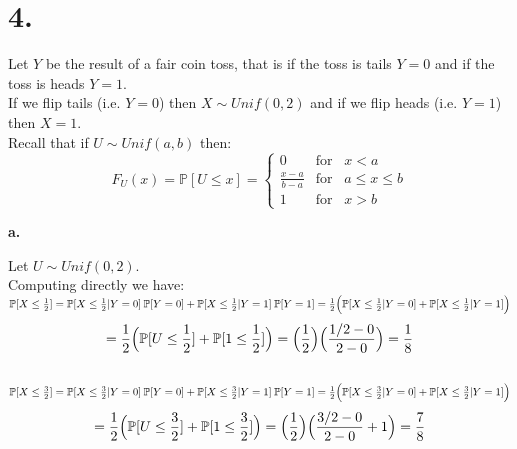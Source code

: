 \documentclass{article}
\begin{document}
\newpage
\section*{4.}
\begin{center}
\doublespacing
    Let $Y$ be the result of a fair coin toss, that is if the toss is tails $Y = 0$ and if the toss is heads $Y = 1$.
    \\If we flip tails (i.e. $Y = 0$) then $X\sim Unif(0, 2)$ and if we flip heads (i.e. $Y = 1$) then $X = 1$.
    \\Recall that if $U\sim Unif(a, b)$ then:
    \[F_U (x) = \mathbb{P}[U\leq x] =
    \begin{cases}
        0 & \mbox{for}\;\;\;x < a \\
        \frac{x - a}{b - a} & \mbox{for}\;\;\;a\leq x\leq b \\
        1 & \mbox{for}\;\;\;x > b
    \end{cases}
    \]
\end{center}

{\Large\textbf{a.}}
\begin{center}
\doublespacing
    Let $U\sim Unif(0, 2)$.
    \\Computing directly we have:
    \\$\mathbb{P}[X\leq\frac{1}{2}] =\mathbb{P}[X\leq\frac{1}{2} | Y = 0]\:\mathbb{P}[Y = 0] +\mathbb{P}[X\leq\frac{1}{2} | Y = 1]\:\mathbb{P}[Y = 1] =\frac{1}{2}\Big{(}\mathbb{P}[X\leq\frac{1}{2} | Y = 0] +\mathbb{P}[X\leq\frac{1}{2} | Y = 1]\Big{)}$
    \[=\frac{1}{2}\Big{(}\mathbb{P}[U\leq\frac{1}{2}] +\mathbb{P}[1\leq\frac{1}{2}]\Big{)} =\Big{(}\frac{1}{2}\Big{)}\Big{(}\frac{1/2 - 0}{2 - 0}\Big{)} =\frac{1}{8}\]
    \\$\mathbb{P}[X\leq\frac{3}{2}] =\mathbb{P}[X\leq\frac{3}{2} | Y = 0]\:\mathbb{P}[Y = 0] +\mathbb{P}[X\leq\frac{3}{2} | Y = 1]\:\mathbb{P}[Y = 1] =\frac{1}{2}\Big{(}\mathbb{P}[X\leq\frac{3}{2} | Y = 0] +\mathbb{P}[X\leq\frac{3}{2} | Y = 1]\Big{)}$
    \[=\frac{1}{2}\Big{(}\mathbb{P}[U\leq\frac{3}{2}] +\mathbb{P}[1\leq\frac{3}{2}]\Big{)} =\Big{(}\frac{1}{2}\Big{)}\Big{(}\frac{3/2 - 0}{2 - 0} + 1\Big{)} =\frac{7}{8}\]
\end{center}
\end{document}
